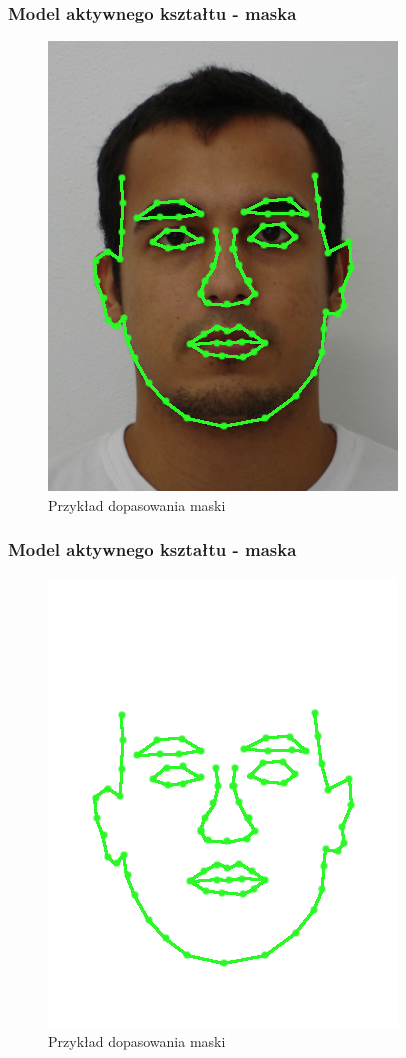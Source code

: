 \documentclass[xcolor=table]{beamer}
\begin{document}
\begin{frame}
  \frametitle{Model aktywnego kształtu - maska}
\begin{center}
  \begin{figure}
    \includegraphics[scale=0.4]{aktywny3.png}
    \caption{Przykład dopasowania maski}
  \end{figure}
\end{center}
\end{frame}

\begin{frame}
  \frametitle{Model aktywnego kształtu - maska}
\begin{center}
  \begin{figure}
    \includegraphics[scale=0.4]{aktywny1.png}
    \caption{Przykład dopasowania maski}
  \end{figure}
\end{center}
\end{frame}
\end{document}
